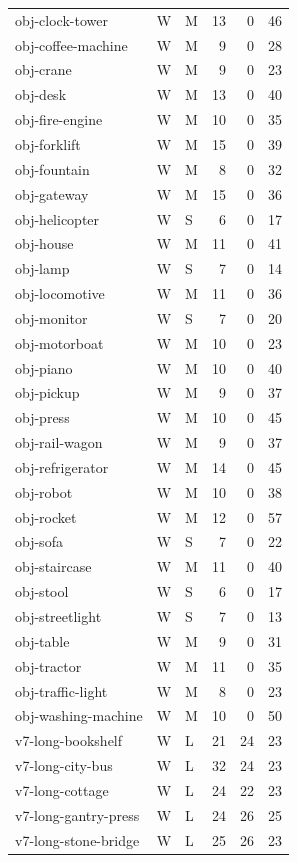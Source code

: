 \begin{longtable}{@{}p{}llrrr@{}}
obj-clock-tower & W & M & 13 & 0 & 46\\
obj-coffee-machine & W & M & 9 & 0 & 28\\
obj-crane & W & M & 9 & 0 & 23\\
obj-desk & W & M & 13 & 0 & 40\\
obj-fire-engine & W & M & 10 & 0 & 35\\
obj-forklift & W & M & 15 & 0 & 39\\
obj-fountain & W & M & 8 & 0 & 32\\
obj-gateway & W & M & 15 & 0 & 36\\
obj-helicopter & W & S & 6 & 0 & 17\\
obj-house & W & M & 11 & 0 & 41\\
obj-lamp & W & S & 7 & 0 & 14\\
obj-locomotive & W & M & 11 & 0 & 36\\
obj-monitor & W & S & 7 & 0 & 20\\
obj-motorboat & W & M & 10 & 0 & 23\\
obj-piano & W & M & 10 & 0 & 40\\
obj-pickup & W & M & 9 & 0 & 37\\
obj-press & W & M & 10 & 0 & 45\\
obj-rail-wagon & W & M & 9 & 0 & 37\\
obj-refrigerator & W & M & 14 & 0 & 45\\
obj-robot & W & M & 10 & 0 & 38\\
obj-rocket & W & M & 12 & 0 & 57\\
obj-sofa & W & S & 7 & 0 & 22\\
obj-staircase & W & M & 11 & 0 & 40\\
obj-stool & W & S & 6 & 0 & 17\\
obj-streetlight & W & S & 7 & 0 & 13\\
obj-table & W & M & 9 & 0 & 31\\
obj-tractor & W & M & 11 & 0 & 35\\
obj-traffic-light & W & M & 8 & 0 & 23\\
obj-washing-machine & W & M & 10 & 0 & 50\\
v7-long-bookshelf & W & L & 21 & 24 & 23\\
v7-long-city-bus & W & L & 32 & 24 & 23\\
v7-long-cottage & W & L & 24 & 22 & 23\\
v7-long-gantry-press & W & L & 24 & 26 & 25\\
v7-long-stone-bridge & W & L & 25 & 26 & 23\\
\bottomrule\end{longtable}

